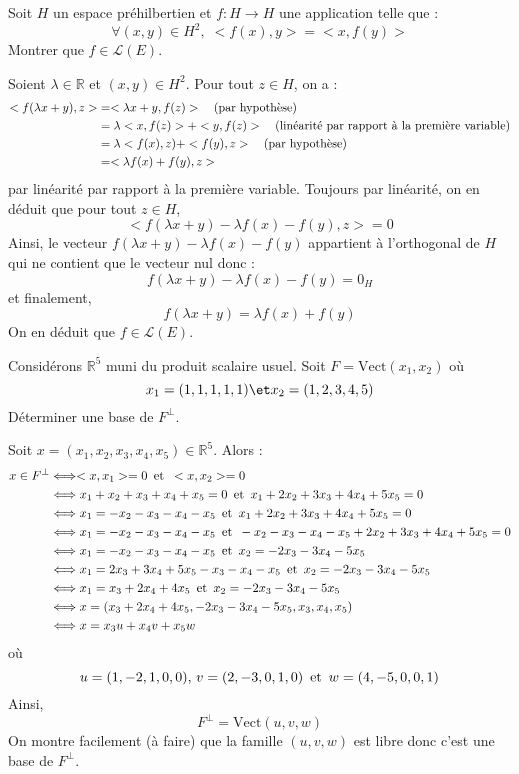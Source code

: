\documentclass[a4paper,10pt]{report}
\begin{document}
\begin{Exa} Soit $H$ un espace préhilbertien et $f : H \rightarrow H$ une application telle que :
$$ \forall (x,y) \in H^2, \; <f(x),y>=<x,f(y)>$$
Montrer que $f \in \mathcal{L}(E)$.
\end{Exa} 

\corr Soient $\lambda \in \mathbb{R}$ et $(x,y) \in H^2$. Pour tout $z \in H$, on a :
\begin{align*}
<f(\lambda x +y),z> & = <\lambda x+y, f(z)> \quad \hbox{(par hypothèse)} \\
& = \lambda <x,f(z)> + <y,f(z)> \quad \hbox{(linéarité par rapport à la première variable)} \\
& = \lambda <f(x),z) + <f(y),z>  \quad \hbox{(par hypothèse)} \\
& = <\lambda f(x)+f(y), z> 
\end{align*}
par linéarité par rapport à la première variable. Toujours par linéarité, on en déduit que pour tout $z \in H$,
$$ <f(\lambda x +y)-\lambda f(x)-f(y), z> =0$$
Ainsi, le vecteur $f(\lambda x +y)-\lambda f(x)-f(y)$ appartient à l'orthogonal de $H$ qui ne contient que le vecteur nul donc :
$$ f(\lambda x +y)-\lambda f(x)-f(y) = 0_H$$
et finalement,
$$ f(\lambda x +y)= \lambda f(x)+f(y)$$
On en déduit que $f \in \mathcal{L}(E)$.

\begin{Exa} Considérons $\mathbb{R}^5$ muni du produit scalaire usuel. Soit $F= \textrm{Vect}(x_1,x_2)$ où
$$ x_1 = (1,1,1,1,1) \et x_2 = (1,2,3,4,5)$$
Déterminer une base de $F^{\perp}$.
\end{Exa} 

\corr Soit $x= (x_1,x_2,x_3,x_4,x_5) \in \mathbb{R}^5$. Alors :
\begin{align*}
x \in F^{\perp} & \Longleftrightarrow <x,x_1>=0 \, \hbox{ et } \,  <x,x_2>=0 \\
& \Longleftrightarrow x_1+x_2+x_3+x_4+x_5=0 \, \hbox{ et } \, x_1+2x_2+3x_3+4x_4+5x_5=0 \\
& \Longleftrightarrow x_1=-x_2-x_3-x_4-x_5 \, \hbox{ et } \, x_1+2x_2+3x_3+4x_4+5x_5=0 \\
& \Longleftrightarrow x_1=-x_2-x_3-x_4-x_5 \, \hbox{ et } \, -x_2-x_3-x_4-x_5+2x_2+3x_3+4x_4+5x_5=0 \\
&  \Longleftrightarrow x_1=-x_2-x_3-x_4-x_5 \, \hbox{ et } \, x_2=-2x_3-3x_4-5x_5 \\
&  \Longleftrightarrow x_1=2x_3+3x_4+5x_5-x_3-x_4-x_5 \, \hbox{ et } \, x_2=-2x_3-3x_4-5x_5 \\
&  \Longleftrightarrow x_1=x_3+2x_4+4x_5 \, \hbox{ et } \, x_2=-2x_3-3x_4-5x_5 \\
& \Longleftrightarrow x= (x_3+2x_4+4x_5, -2x_3-3x_4-5x_5,x_3,x_4,x_5) \\
& \Longleftrightarrow x= x_3 u+x_4 v+ x_5w
\end{align*}
où
$$ u=(1,-2,1,0,0), \, v =(2,-3,0,1,0) \, \hbox{ et } \, w=(4,-5,0,0,1)$$
Ainsi,
$$ F^{\perp} = \textrm{Vect}(u,v,w)$$
On montre facilement (à faire) que la famille $(u,v,w)$ est libre donc c'est une base de $F^{\perp}$.
\end{document}
